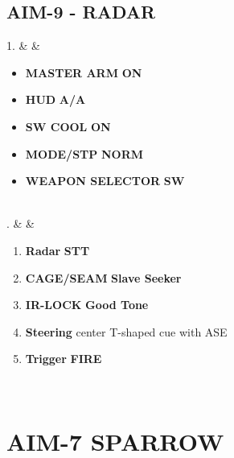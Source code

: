 \documentclass[fontInter]{TechCheck}
\begin{document}
	\subsection{AIM-9 - RADAR}
	\begin{listtabular}
		1. &  &
		\begin{minipage}[t]{\linewidth}
			\vspace{-7pt}
			\begin{itemize}
				\item \textbf{MASTER ARM} \dotfill \textbf{ON}
				\item \textbf{HUD} \dotfill \textbf{A/A}
				\item \textbf{SW COOL} \dotfill \textbf{ON}
				\item \textbf{MODE/STP} \dotfill \textbf{NORM}
				\item \textbf{WEAPON SELECTOR} \dotfill \textbf{SW}
			\end{itemize}
		\end{minipage} \\
		. &  &
		\begin{minipage}[t]{\linewidth}
			\vspace{-7pt}
			\begin{enumerate}
				\item \textbf{Radar} \dotfill \textbf{STT}
				\item \textbf{CAGE/SEAM} \dotfill \textbf{Slave Seeker}
				\item \textbf{IR-LOCK} \dotfill \textbf{Good Tone}
				\item \textbf{Steering} \dotfill center T-shaped cue with ASE
				\item \textbf{Trigger} \dotfill \textbf{FIRE}
			\end{enumerate}
		\end{minipage} \\
	\end{listtabular}

	\clearpage

	\section{AIM-7 SPARROW}
\end{document}
